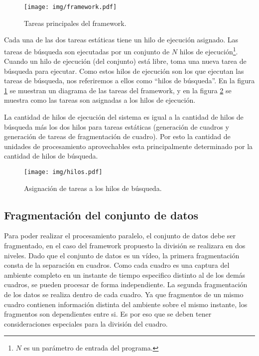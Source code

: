 \begin{figure}[!h]
	
	\centering

	\texttt{[image: img/framework.pdf]}

	\caption{Tareas principales del framework.}

	\label{tareasFramework}

\end{figure}

Cada una de las dos tareas estáticas tiene un hilo de ejecución asignado. Las
tareas de búsqueda son ejecutadas por un conjunto de $N$ hilos de
ejecución\footnote{$N$ es un parámetro de entrada del programa.}. Cuando un hilo
de ejecución (del conjunto) está libre, toma una nueva tarea de búsqueda para
ejecutar. Como estos hilos de ejecución son los que ejecutan las tareas de
búsqueda, nos referiremos a ellos como ``hilos de búsqueda''. En la figura
\ref{tareasFramework} se muestran un diagrama de las tareas del framework, y en
la figura \ref{hilosFramework} se muestra como las tareas son asignadas a los
hilos de ejecución.

La cantidad de hilos de ejecución del sistema es igual a la cantidad de hilos de
búsqueda más los dos hilos para tareas estáticas (generación de cuadros y
generación de tareas de fragmentación de cuadro). Por esto la cantidad de
unidades de procesamiento aprovechables esta principalmente determinado por la
cantidad de hilos de búsqueda.

\begin{figure}[!h]

	\texttt{[image: img/hilos.pdf]}

	\caption{Asignación de tareas a los hilos de búsqueda.}

	\label{hilosFramework}

\end{figure}

\subsection{Fragmentación del conjunto de datos}

Para poder realizar el procesamiento paralelo, el conjunto de datos debe ser
fragmentado, en el caso del framework propuesto la división se realizara en
dos niveles. Dado que el conjunto de datos es un vídeo, la primera
fragmentación consta de la separación en cuadros. Como cada cuadro es una
captura del ambiente completo en un instante de tiempo especifico distinto al de
los demás cuadros, se pueden procesar de forma independiente. La segunda
fragmentación de los datos se realiza dentro de cada cuadro. Ya que fragmentos
de un mismo cuadro contienen información distinta del ambiente sobre el mismo
instante, los fragmentos son dependientes entre si. Es por eso que se deben
tener consideraciones especiales para la división del cuadro.

